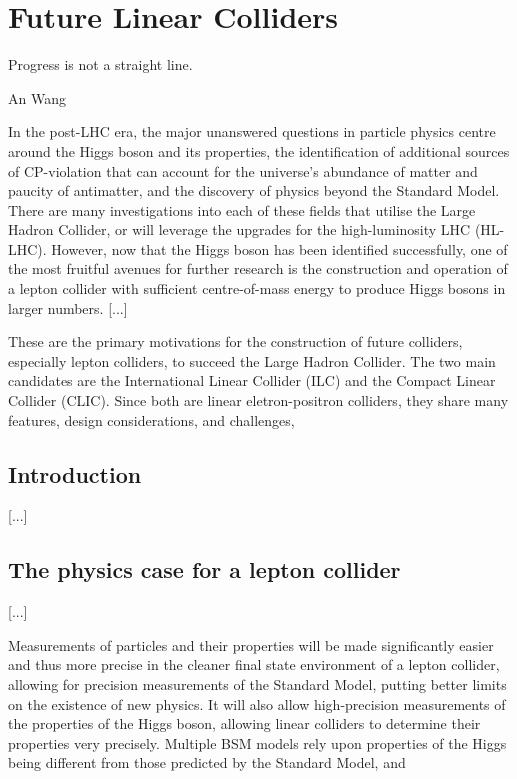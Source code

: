 \chapter{Future Linear Colliders}
\label{chapter:colliders}

\epigraph{Progress is not a straight line.}{An Wang}

In the post-LHC era, the major unanswered questions in particle physics centre around the Higgs boson and its properties, the identification of additional sources of CP-violation that can account for the universe's abundance of matter and paucity of antimatter, and the discovery of physics beyond the Standard Model. There are many investigations into each of these fields that utilise the Large Hadron Collider, or will leverage the upgrades for the high-luminosity LHC (HL-LHC). However, now that the Higgs boson has been identified successfully, one of the most fruitful avenues for further research is the construction and operation of a lepton collider with sufficient centre-of-mass energy to produce Higgs bosons in larger numbers. [...]

These are the primary motivations for the construction of future colliders, especially lepton colliders, to succeed the Large Hadron Collider. The two main candidates are the International Linear Collider (ILC) and  the Compact Linear Collider (CLIC). Since both are linear eletron-positron colliders, they share many features, design considerations, and challenges, 


\section{Introduction}
[...]

\section{The physics case for a lepton collider}
[...]

Measurements of particles and their properties will be made significantly easier and thus more precise in the cleaner final state environment of a lepton collider, allowing for precision measurements of the Standard Model, putting better limits on the existence of new physics. It will also allow high-precision measurements of the properties of the Higgs boson, allowing linear colliders to determine their properties very precisely. Multiple BSM models rely upon properties of the Higgs being different from those predicted by the Standard Model, and 

